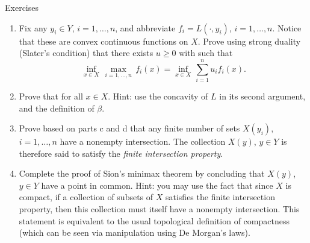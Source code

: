 \begin{xcb}{Exercises}
\begin{enumerate}[label=\thechapter.\arabic*]
\begin{enumerate}[label=\alph*.]
\item Fix any $y_i \in Y$, $i=1,\dots,n$, and abbreviate $f_i = L(\cdot,
  y_i)$, $i=1,\dots,n$. Notice that these are convex continuous functions on 
  $X$. Prove using strong duality (Slater's condition) that there exists $u \geq
  0$ with  such that       
  \[
  \inf_{x \in X} \, \max_{i=1,\dots,n} \, f_i(x) = \inf_{x \in X} \,
  \sum_{i=1}^n u_i f_i(x). 
  \]

\item Prove that  for all $x \in
  X$. Hint: use the concavity of $L$ in its second argument, and the definition
  of $\beta$. 

\item Prove based on parts c and d that any finite number of sets $X(y_i)$, $i =
  1,\dots,n$ have a nonempty intersection. The collection $X(y)$, $y \in Y$ is
  therefore said to satisfy the \emph{finite intersection property}. 

\item Complete the proof of Sion's minimax theorem by concluding that $X(y)$, $y
  \in Y$ have a point in common. Hint: you may use the fact that since $X$ is
  compact, if a collection of subsets of $X$ satisfies the finite intersection
  property, then this collection must itself have a nonempty intersection. This
  statement is equivalent to the usual topological definition of compactness 
  (which can be seen via manipulation using De Morgan's laws).      
\end{enumerate}




\end{enumerate}
\end{xcb}